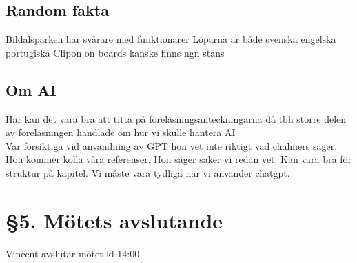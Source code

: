 \documentclass[a4paper, 11pt]{article}
\begin{document}
    \subsection*{Random fakta}
    Bildalsparken har svårare med funktionärer
    Löparna är både svenska engelska portugiska 
    Clipon on boards kanske finns ngn stans 


    \subsection*{Om AI}
    Här kan det vara bra att titta på föreläsningsanteckningarna då tbh större delen av föreläsningen handlade om hur vi skulle hantera AI \\
    Var försiktiga vid användning av GPT hon vet inte riktigt vad chalmers säger. Hon kommer kolla våra referenser. Hon säger saker vi redan vet. Kan vara bra för struktur på kapitel. Vi måste vara tydliga när vi använder chatgpt. 

    \section*{§5. Mötets avslutande}
Vincent avslutar mötet kl 14:00
\newpage
\thispagestyle{style2}
\makebox{}\\
\makebox{}\\
\makebox{}\\
\makebox[0.4\linewidth]{\rule{0.4\linewidth}{0.4pt}} \hspace{1cm} \makebox[0.4\linewidth]{\rule{0.4\linewidth}{0.4pt}} \hspace{1cm}\\
 \hspace{1cm}
 \hspace{1cm}\\
 \hspace{1cm}
 \hspace{1cm}\\
\makebox{}\\
\makebox{}\\
\makebox{}\\
\end{document}
